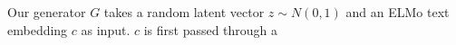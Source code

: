 Our generator $G$ takes a random latent vector $z \sim N(0, 1)$ and an ELMo text embedding $c$ as input. $c$ is first passed through a 